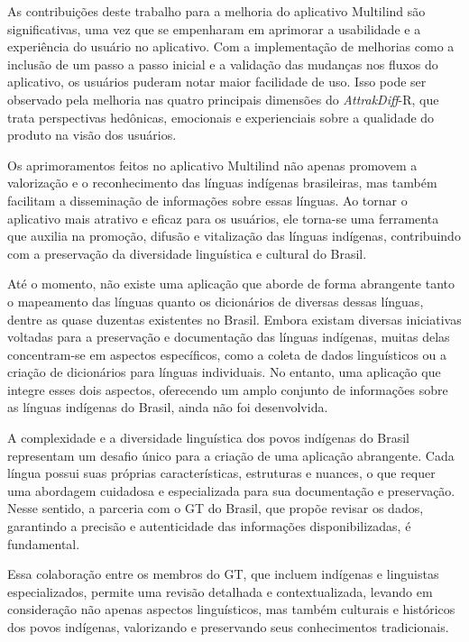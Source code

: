 As contribuições deste trabalho para a melhoria do aplicativo Multilind são significativas, uma vez que se empenharam em aprimorar a usabilidade e a experiência do usuário no aplicativo. 
Com a implementação de melhorias como a inclusão de um passo a passo inicial e a validação das mudanças nos fluxos do aplicativo, os usuários puderam notar maior facilidade de uso. 
Isso pode ser observado pela melhoria nas quatro principais dimensões do \textit{AttrakDiff}-R, que trata perspectivas hedônicas, emocionais e experienciais sobre a qualidade do produto na visão 
dos usuários.

Os aprimoramentos feitos no aplicativo Multilind não apenas promovem a valorização e o reconhecimento das línguas indígenas brasileiras, mas também facilitam a disseminação de informações sobre 
essas línguas. Ao tornar o aplicativo mais atrativo e eficaz para os usuários, ele torna-se uma ferramenta que auxilia na promoção, difusão e vitalização das línguas indígenas, contribuindo com 
a preservação da diversidade linguística e cultural do Brasil.

Até o momento, não existe uma aplicação que aborde de forma abrangente tanto o mapeamento das línguas quanto os dicionários de diversas dessas línguas, dentre as quase duzentas existentes no Brasil. Embora 
existam diversas iniciativas voltadas para a preservação e documentação das línguas indígenas, muitas delas concentram-se em aspectos específicos, como a coleta de dados linguísticos ou a criação de 
dicionários para línguas individuais. No entanto, uma aplicação que integre esses dois aspectos, oferecendo um amplo conjunto de informações sobre as línguas indígenas do Brasil, ainda não foi desenvolvida.

A complexidade e a diversidade linguística dos povos indígenas do Brasil representam um desafio único para a criação de uma aplicação abrangente. Cada língua possui suas próprias características, estruturas 
e nuances, o que requer uma abordagem cuidadosa e especializada para sua documentação e preservação. Nesse sentido, a parceria com o GT do Brasil, que propõe revisar os dados, garantindo a precisão e autenticidade 
das informações disponibilizadas, é fundamental. 

Essa colaboração entre os membros do GT, que incluem indígenas e linguistas especializados, permite uma revisão detalhada e contextualizada, levando em consideração não apenas aspectos linguísticos, mas também 
culturais e históricos dos povos indígenas, valorizando e preservando seus conhecimentos tradicionais.

